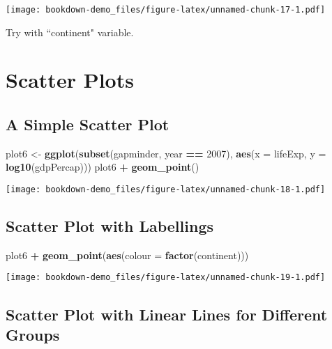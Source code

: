 \documentclass[
]{book}
\newenvironment{Shaded}{\begin{snugshade}}{\end{snugshade}}
\newcommand{\DataTypeTok}[1]{\textcolor[rgb]{0.13,0.29,0.53}{#1}}
\newcommand{\DecValTok}[1]{\textcolor[rgb]{0.00,0.00,0.81}{#1}}
\newcommand{\KeywordTok}[1]{\textcolor[rgb]{0.13,0.29,0.53}{\textbf{#1}}}
\newcommand{\NormalTok}[1]{#1}
\newcommand{\OperatorTok}[1]{\textcolor[rgb]{0.81,0.36,0.00}{\textbf{#1}}}
\newcommand{\StringTok}[1]{\textcolor[rgb]{0.31,0.60,0.02}{#1}}
\begin{document}
\texttt{[image: bookdown-demo\_files/figure-latex/unnamed-chunk-17-1.pdf]}

Try with ``continent" variable.

\hypertarget{scatter-plots}{%
\section{Scatter Plots}\label{scatter-plots}}

\hypertarget{a-simple-scatter-plot}{%
\subsection{A Simple Scatter Plot}\label{a-simple-scatter-plot}}

\begin{Shaded}
\begin{Highlighting}[]
\NormalTok{plot6 <-}\StringTok{ }\KeywordTok{ggplot}\NormalTok{(}\KeywordTok{subset}\NormalTok{(gapminder, year }\OperatorTok{==}\StringTok{ }\DecValTok{2007}\NormalTok{),}
                \KeywordTok{aes}\NormalTok{(}\DataTypeTok{x =}\NormalTok{ lifeExp, }\DataTypeTok{y =} \KeywordTok{log10}\NormalTok{(gdpPercap)))}
\NormalTok{plot6 }\OperatorTok{+}
\StringTok{  }\KeywordTok{geom_point}\NormalTok{()}
\end{Highlighting}
\end{Shaded}

\texttt{[image: bookdown-demo\_files/figure-latex/unnamed-chunk-18-1.pdf]}

\hypertarget{scatter-plot-with-labellings}{%
\subsection{Scatter Plot with Labellings}\label{scatter-plot-with-labellings}}

\begin{Shaded}
\begin{Highlighting}[]
\NormalTok{plot6 }\OperatorTok{+}
\StringTok{  }\KeywordTok{geom_point}\NormalTok{(}\KeywordTok{aes}\NormalTok{(}\DataTypeTok{colour =} \KeywordTok{factor}\NormalTok{(continent)))}
\end{Highlighting}
\end{Shaded}

\texttt{[image: bookdown-demo\_files/figure-latex/unnamed-chunk-19-1.pdf]}

\hypertarget{scatter-plot-with-linear-lines-for-different-groups}{%
\subsection{Scatter Plot with Linear Lines for Different Groups}\label{scatter-plot-with-linear-lines-for-different-groups}}
\end{document}
